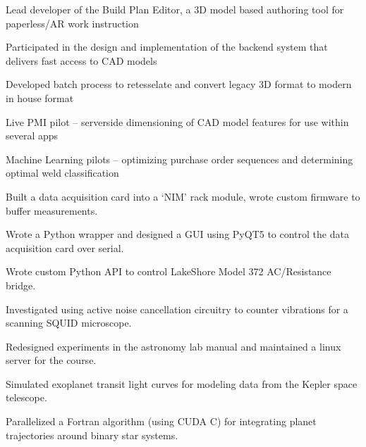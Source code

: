 \documentclass[]{resume-template}
\begin{document}
\begin{tightemize}
\item Lead developer of the Build Plan Editor,  a 3D model based authoring tool for paperless/AR work instruction
\item Participated in the design and implementation of the backend system that delivers fast access to CAD models
\item Developed batch process to retesselate and convert legacy 3D format to modern in house format
\item Live PMI pilot -- serverside dimensioning of CAD model features for use within several apps
\item Machine Learning pilots -- optimizing purchase order sequences and determining optimal weld classification
\end{tightemize}
\sectionsep

\begin{tightemize}
\item Built a data acquisition card into a `NIM' rack module,  wrote custom firmware to buffer measurements.
\item Wrote a Python wrapper and designed a GUI using PyQT5 to control the data acquisition card over serial. 
\item Wrote custom Python API to control LakeShore Model 372 AC/Resistance bridge.
\item Investigated using active noise cancellation circuitry to counter vibrations for a scanning SQUID microscope.
\item Redesigned experiments in the astronomy lab manual and maintained a linux server for the course.
\end{tightemize}
\sectionsep
\vspace{-1ex} %
\begin{tightemize}
\item Simulated exoplanet transit light curves for modeling data from the Kepler space telescope.
\item Parallelized a Fortran algorithm (using CUDA C) for integrating planet trajectories around binary star systems.
\end{tightemize}
\sectionsep
\end{document}
